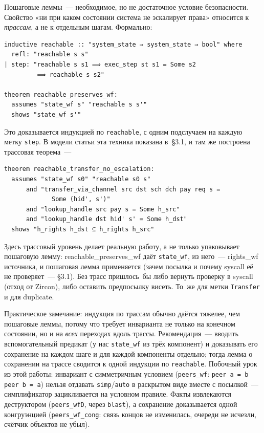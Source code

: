 \documentclass[11pt,a4paper]{article}
\newcommand{\isabel}[1]{{\isabelleit #1}}
\newcommand{\lemmaname}[1]{\isabel{#1}}
\begin{document}
Пошаговые леммы~--- необходимое, но не достаточное условие безопасности.
Свойство «ни при каком состоянии система не эскалирует права» относится к
\emph{трассам}, а не к отдельным шагам. Формально:

\begin{lstlisting}
inductive reachable :: "system_state ⇒ system_state ⇒ bool" where
  refl: "reachable s s"
| step: "reachable s s1 ⟹ exec_step st s1 = Some s2
         ⟹ reachable s s2"

theorem reachable_preserves_wf:
  assumes "state_wf s" "reachable s s'"
  shows "state_wf s'"
\end{lstlisting}

Это доказывается индукцией по \texttt{reachable}, с одним подслучаем на
каждую метку \texttt{step}. В модели статьи эта техника показана в~§3.1,
и там же построена трассовая теорема~---

\begin{lstlisting}
theorem reachable_transfer_no_escalation:
  assumes "state_wf s0" "reachable s0 s"
      and "transfer_via_channel src dst sch dch pay req s =
             Some (hid', s')"
      and "lookup_handle src pay s = Some h_src"
      and "lookup_handle dst hid' s' = Some h_dst"
  shows "h_rights h_dst ⊆ h_rights h_src"
\end{lstlisting}

Здесь трассовый уровень делает реальную работу, а не только упаковывает
пошаговую лемму: \lemmaname{reachable\_preserves\_wf} даёт
\texttt{state\_wf}, из него~--- \lemmaname{rights\_wf} источника, и
пошаговая лемма применяется (зачем посылка и почему syscall её не
проверяет~--- §3.1). Без трасс пришлось~бы либо вернуть проверку в
syscall (отход от Zircon), либо оставить предпосылку висеть. То~же для
метки \texttt{Transfer} и для duplicate.

Практическое замечание: индукция по трассам обычно даётся тяжелее, чем
пошаговые леммы, потому что требует инварианта не только на конечном
состоянии, но и на \emph{всех} переходах вдоль трассы. Рекомендация~---
вводить вспомогательный предикат (у нас \texttt{state\_wf} из трёх
компонент) и доказывать его сохранение на каждом шаге и для каждой
компоненты отдельно; тогда лемма о сохранении на трассе сводится к одной
индукции по \texttt{reachable}. Побочный урок из этой работы: инвариант
с симметричным условием (\texttt{peers\_wf}: \texttt{peer~a = b
	\textrightarrow{} peer~b = a}) нельзя отдавать \texttt{simp}/\texttt{auto}
в раскрытом виде вместе с посылкой~--- симплификатор зацикливается на
условном правиле. Факты извлекаются деструктором
(\texttt{peers\_wfD}, через \texttt{blast}), а сохранение доказывается
одной конгруэнцией (\texttt{peers\_wf\_cong}: связь концов не
изменилась, очереди не исчезли, счётчик объектов не убыл).
\end{document}
